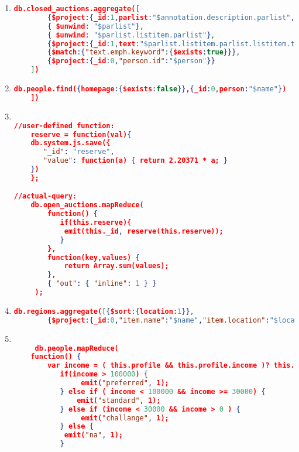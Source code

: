 \begin{enumerate}[label=Q\arabic*]
    \item \label{mongodb-q-16}%
	\begin{lstlisting}[language=JSON,   basicstyle=\scriptsize]
	  db.closed_auctions.aggregate([
		{$project:{_id:1,parlist:"$annotation.description.parlist",person:"$seller.person"}},
		{ $unwind: "$parlist"},
		{ $unwind: "$parlist.listitem.parlist"},
		{$project:{_id:1,text:"$parlist.listitem.parlist.listitem.text",person:1}},
		{$match:{"text.emph.keyword":{$exists:true}}},
		{$project:{_id:0,"person.id":"$person"}}
	])
	\end{lstlisting}	

    \item \label{mongodb-q-17}%
	\begin{lstlisting}[language=JSON,   basicstyle=\scriptsize]
	  db.people.find({homepage:{$exists:false}},{_id:0,person:"$name"})
	])
	\end{lstlisting}	

    \item \label{mongodb-q-18}%
	\begin{lstlisting}[language=JSON,   basicstyle=\scriptsize]
	
//user-defined function:
    reserve = function(val){
    db.system.js.save({ 
       "_id": "reserve", 
       "value": function(a) { return 2.20371 * a; } 
    })
    };

//actual-query:
    db.open_auctions.mapReduce(
        function() {
           if(this.reserve){
            emit(this._id, reserve(this.reserve));
           }    
        },
        function(key,values) {
            return Array.sum(values);
        },
        { "out": { "inline": 1 } }
     );
\end{lstlisting}	

    \item \label{mongodb-q-19}%
	\begin{lstlisting}[language=JSON,   basicstyle=\scriptsize]
	  db.regions.aggregate([{$sort:{location:1}},
		{$project:{_id:0,"item.name":"$name","item.location":"$location"}}])
	\end{lstlisting}	
    
    \item \label{mongodb-q-20}%
	\begin{lstlisting}[language=JSON,   basicstyle=\scriptsize]
	
	 db.people.mapReduce(
    function() {
        var income = ( this.profile && this.profile.income )? this.profile.income : 0;
           if(income > 100000) {
                emit("preferred", 1);   
           } else if ( income < 100000 && income >= 30000) {
               emit("standard", 1);
           } else if (income < 30000 && income > 0 ) {
                emit("challange", 1);
           } else {
            emit("na", 1);
           }
       

\end{lstlisting}
\end{enumerate}
